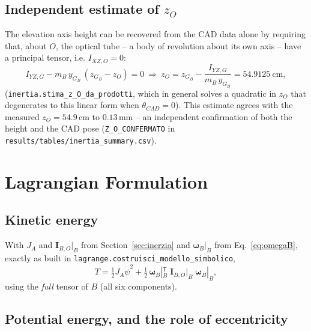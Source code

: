 \documentclass[11pt,a4paper]{article}
\numberwithin{equation}{section}
\newcommand{\bs}[1]{\boldsymbol{#1}}
\newcommand{\T}{^{\mathsf T}}
\begin{document}
\subsection{Independent estimate of $z_O$}
\label{subsec:zO}

The elevation axis height can be recovered from the CAD data alone by requiring that, about $O$, the optical tube -- a body of revolution about its own axis -- have a principal tensor, i.e. $I_{XZ,O}=0$:
\begin{equation}
I_{YZ,G} - m_B\,y_{G_B}\,(z_{G_B}-z_O) = 0
\ \Longrightarrow\
z_O = z_{G_B} - \frac{I_{YZ,G}}{m_B\,y_{G_B}} = 54.9125\ \text{cm},
\label{eq:zO-stima}
\end{equation}
(\texttt{inertia.stima\_z\_O\_da\_prodotti}, which in general solves a quadratic in $z_O$ that degenerates to this linear form when $\theta_{CAD}=0$). This estimate agrees with the measured $z_O=54.9$\,cm to $0.13$\,mm -- an independent confirmation of both the height and the CAD pose (\texttt{Z\_O\_CONFERMATO} in \texttt{results/tables/inertia\_summary.csv}).

\section{Lagrangian Formulation}
\label{sec:lagrange}

\subsection{Kinetic energy}

With $J_A$ and $\bs I_{B,O}|_B$ from Section~\ref{sec:inerzia} and $\bs\omega_B|_B$ from Eq.~\eqref{eq:omegaB}, exactly as built in \texttt{lagrange.\allowbreak costruisci\_\allowbreak modello\_\allowbreak simbolico},
\begin{equation}
T = \tfrac12 J_A\dot\psi^2 + \tfrac12\,\bs\omega_B|_B\T\;\bs I_{B,O}\big|_B\;\bs\omega_B|_B ,
\label{eq:T}
\end{equation}
using the \emph{full} tensor of $B$ (all six components).

\subsection{Potential energy, and the role of eccentricity}
\label{subsec:V}
\end{document}
